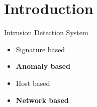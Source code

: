 \section{Introduction}
\begin{frame}

Intrusion Detection System
\begin{itemize}
	\item Signature based
	\item \textbf{Anomaly based}
	\item Host based
	\item \textbf{Network based}
\end{itemize}

\end{frame}